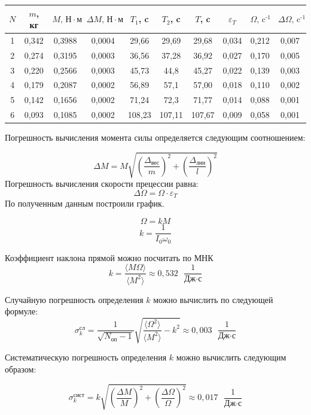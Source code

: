 \documentclass[a4paper,12pt]{article}
\begin{document}
\begin{table}[!ht]
    \centering
    \begin{tabular}{|c|c|c|c|c|c|c|c|c|c|}
    \hline
        $N$ & $m$, кг & $M \text{, Н} \cdot м$  & $\Delta M \text{, Н} \cdot м $ & $T_1$, c & $T_2$, c & $T$, c & $\varepsilon_T$ & $\Omega \text{, c}^\text{-1}$ & $\Delta \Omega  \text{, c}^\text{-1}$  \\ \hline
        1 & 0,342 &  0,3988 & 0,0004 & 29,66 & 29,69 & 29,68 & 0,034 & 0,212 & 0,007  \\ \hline
        2 & 0,274 & 0,3195 & 0,0003 & 36,56 & 37,28 & 36,92 & 0,027 & 0,170 & 0,005  \\ \hline
        3 & 0,220 & 0,2566 & 0,0003 & 45,73 & 44,8 & 45,27 & 0,022 & 0,139 & 0,003  \\ \hline
        4 & 0,179 & 0,2087 & 0,0002 & 56,89 & 57,1 & 57,00 & 0,018 & 0,110 & 0,002  \\ \hline
        5 & 0,142 & 0,1656 & 0,0002 & 71,24 & 72,3 & 71,77 & 0,014 & 0,088 & 0,001  \\ \hline
        6 & 0,093 & 0,1085 & 0,0002 & 108,23 & 107,11 & 107,67 & 0,009 & 0,058 & 0,001 \\ \hline
    \end{tabular}
\end{table}

Погрешность вычисления момента силы определяется следующим соотношением:
	

	$$\Delta M = M\sqrt{\left( \frac{\Delta_\text{вес}}{m} \right)^2 + \left( \frac{\Delta_\text{лин}}{l} \right)^2}$$
	Погрешность вычисления скорости прецессии равна:
		$$\Delta \Omega = \Omega \cdot \varepsilon_T$$
    По полученным данным построили график.

    $$\Omega = kM$$
    $$k = \frac{1}{I_0\omega_0}$$

    Коэффициент наклона прямой можно посчитать по МНК
    $$k = \frac{\langle M\Omega\rangle}{\langle M^2 \rangle} \approx 0,532 \text{ } \frac{1}{\text{Дж} \cdot \text{с}}$$

    Случайную погрешность определения $ k $ можно вычислить по следующей формуле:
    $$\sigma^\text{сл}_k = \frac{1}{\sqrt{N_\text{оп}-1}} \sqrt{\frac{\langle \Omega^2 \rangle}{\langle M^2 \rangle} - k^2} \approx 0,003 \text{ } \frac{1}{\text{Дж} \cdot \text{с}}$$

    Систематическую погрешность определения $ k $ можно вычислить следующим образом:
	
	$$\sigma^\text{сист}_k = k\sqrt{\left( \frac{\Delta M}{M} \right)^2+\left(\frac{\Delta \Omega}{\Omega} \right)^2} \approx 0,017 \text{ } \frac{1}{\text{Дж} \cdot \text{с}}$$
\end{document}
